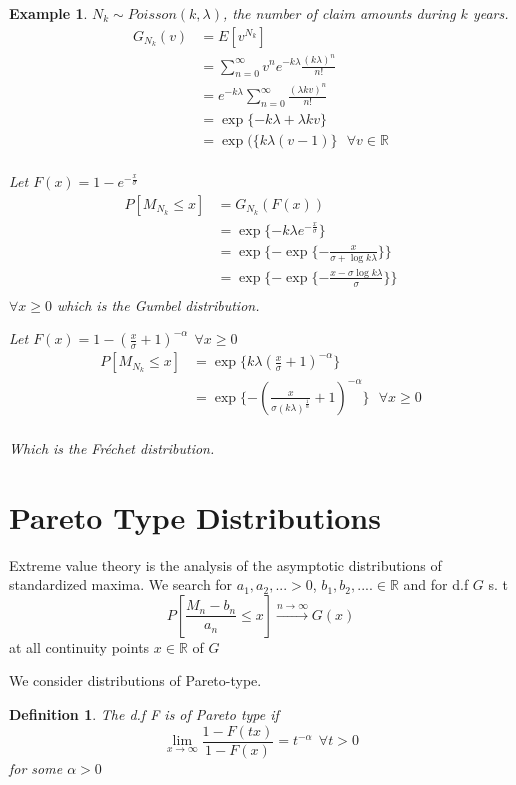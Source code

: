 \documentclass[11pt,a4paper,oneside]{article}\usepackage[]{graphicx}\usepackage[]{color}
\newtheorem{exm}{Example}[subsection]
\newtheorem{defi}[subsection]{Definition}
\begin{document}
\begin{exm}$N_k\sim Poisson(k,\lambda)$, the number of claim amounts during $k$ years.
\begin{align*}
G_{N_k}(v)&=E[v^{N_k}]\\
&=\displaystyle\sum_{n=0}^{\infty}v^ne^{-k\lambda}\frac{(k\lambda)^n}{n!}\\
&=e^{-k\lambda}\displaystyle\sum_{n=0}^{\infty}\frac{(\lambda kv)^n}{n!}\\
&=\exp\{-k\lambda+\lambda k v\}\\
&=\exp(\{k\lambda(v-1)\}\ \ \ \forall v\in\mathbb{R}\\
\end{align*}

Let $F(x)=1-e^{-\frac{x}{\sigma}}$
\begin{align*}
P[M_{N_k}\leq x]&=G_{N_k}(F(x))\\
&=\exp\{-k\lambda e^{-\frac{x}{\sigma}}\}\\
&=\exp\{-\exp\{-\frac{x}{\sigma+\log k\lambda}\}\}\\
&=\exp\{-\exp\{-\frac{x-\sigma \log  k\lambda}{\sigma}\}\}\\
\end{align*}
$\forall x\geq 0$ which is the Gumbel distribution.

Let $F(x)=1-(\frac{x}{\sigma}+1)^{-\alpha}\ \ \forall x\geq 0$
\begin{align*}
P[M_{N_k}\leq x]&=\exp\{k\lambda(\frac{x}{\sigma}+1)^{-\alpha}\}\\
&=\exp\{-(\frac{x}{\sigma(k\lambda)^{\frac{1}{\alpha}}}+1)^{-\alpha}\}\ \ \ \forall x \geq 0\\
\end{align*}

Which is the Fréchet distribution.
\end{exm}
\section{Pareto Type Distributions}
Extreme value theory is the analysis of the asymptotic distributions of standardized maxima.
We search for $a_1,a_2,...>0$, $b_1,b_2,....\in\mathbb{R}$ and for d.f $G$ s. t
$$P\left[\frac{M_n-b_n}{a_n}\leq x\right]\xrightarrow{n\rightarrow\infty}G(x)$$
at all continuity points $x\in\mathbb{R}$ of $G$

We consider distributions of Pareto-type.
\begin{defi}
The d.f F is of Pareto type if $$\lim_{x\rightarrow\infty}\frac{1-F(tx)}{1-F(x)}=t^{-\alpha}\ \ \forall t>0$$
for some $\alpha>0$
\end{defi}
\end{document}
